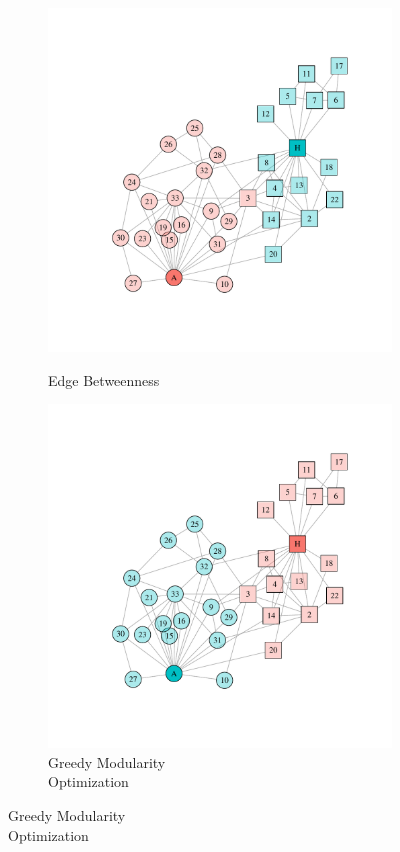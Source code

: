 \begin{figure}
\centering
\begin{subfigure}[b]{0.32\textwidth}
\caption{Edge Betweenness}
\includegraphics[width=\textwidth,trim={0.75in 0.75in 0.75in 0.75in}, clip=True]{edge_betweenness.pdf}
\label{fig:edge_betweenness}
\end{subfigure}
\hfill
\begin{subfigure}[b]{0.32\textwidth}
\caption{Greedy Modularity \\Optimization}
\includegraphics[width=\textwidth,trim={0.75in 0.75in 0.75in 0.75in}, clip=True]{fast_greedy.pdf}

\end{subfigure}
\end{figure}
